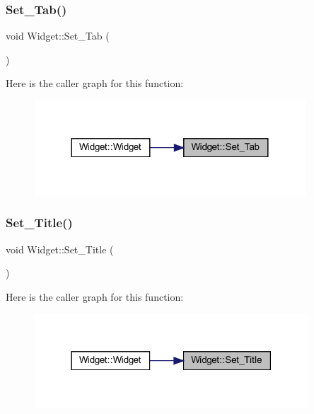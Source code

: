 \subsubsection{\texorpdfstring{Set\_Tab()}{Set\_Tab()}}
{\footnotesize\ttfamily void Widget\+::\+Set\+\_\+\+Tab (\begin{DoxyParamCaption}{ }\end{DoxyParamCaption})}

Here is the caller graph for this function\+:
\nopagebreak
\begin{figure}[H]
\begin{center}
\leavevmode
\includegraphics[width=288pt]{class_widget_ac611086a6f74fe7bab712f23ab7126d8_icgraph}
\end{center}
\end{figure}
\mbox{\label{class_widget_a5323ca5c4124c0d187a2f1398ef48844}} 
\subsubsection{\texorpdfstring{Set\_Title()}{Set\_Title()}}
{\footnotesize\ttfamily void Widget\+::\+Set\+\_\+\+Title (\begin{DoxyParamCaption}{ }\end{DoxyParamCaption})}

Here is the caller graph for this function\+:
\nopagebreak
\begin{figure}[H]
\begin{center}
\leavevmode
\includegraphics[width=291pt]{class_widget_a5323ca5c4124c0d187a2f1398ef48844_icgraph}
\end{center}
\end{figure}
\mbox{\label{class_widget_ac60c5a62bc3197fbc7ade8f40df70c70}} 
